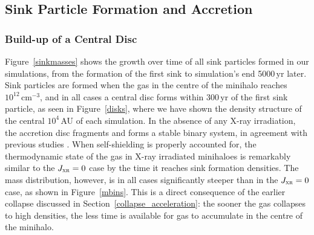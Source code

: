 \documentclass{thesis}
\newcommand{\cc}{\ensuremath{\,\mathrm{cm}^{-3}}\xspace}
\newcommand{\yr}{\ensuremath{\,\mathrm{yr}}\xspace}
\newcommand{\jxr}{\ensuremath{J_{\textsc{xr}}}\xspace}
\newcommand{\RefFig}[1]{\mbox{Figure~\ref{#1}}}
\newcommand{\RefSec}[1]{\mbox{Section~\ref{#1}}}
\begin{document}
\subsection{Sink Particle Formation and Accretion}
\subsubsection{Build-up of a Central Disc}
 \RefFig{sinkmasses} shows the growth over time of all sink particles formed in our simulations, from the formation of the first sink to simulation's end 5000\yr later.  Sink particles are formed when the gas in the centre of the minihalo reaches $10^{12}\cc$, and in all cases a central disc forms within $300\yr$ of the first sink particle, as seen in \RefFig{disks}, where we have shown the density structure of the central $10^4\,$AU of each simulation.  In the absence of any X-ray irradiation, the accretion disc fragments and forms a stable binary system, in agreement with previous studies \citep[e.g.,][]{ StacyGreifBromm2010, Clarketal2011a, Clarketal2011b, Greifetal2011, Greifetal2012}. When self-shielding is properly accounted for, the thermodynamic state of the gas in X-ray irradiated minihaloes is remarkably similar to the $\jxr=0$ case by the time it reaches sink formation densities. The mass distribution, however, is in all cases significantly steeper than in the $\jxr=0$ case, as shown in \RefFig{mbins}. This is a direct consequence of the earlier collapse discussed in \RefSec{collapse_acceleration}: the sooner the gas collapses to high densities, the less time is available for gas to accumulate in the centre of the minihalo. 
\end{document}

